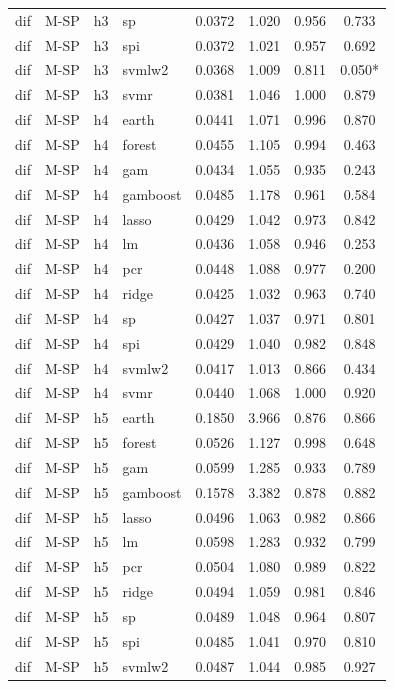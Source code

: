 \begin{ThreePartTable}
\begin{longtable}[t]{llclcccc}
dif & M-SP & h3 & sp & 0.0372 & 1.020 & 0.956 & 0.733\\
dif & M-SP & h3 & spi & 0.0372 & 1.021 & 0.957 & 0.692\\
dif & M-SP & h3 & svmlw2 & 0.0368 & 1.009 & 0.811 & 0.050*\\
dif & M-SP & h3 & svmr & 0.0381 & 1.046 & 1.000 & 0.879\\
\addlinespace
dif & M-SP & h4 & earth & 0.0441 & 1.071 & 0.996 & 0.870\\
dif & M-SP & h4 & forest & 0.0455 & 1.105 & 0.994 & 0.463\\
dif & M-SP & h4 & gam & 0.0434 & 1.055 & 0.935 & 0.243\\
dif & M-SP & h4 & gamboost & 0.0485 & 1.178 & 0.961 & 0.584\\
dif & M-SP & h4 & lasso & 0.0429 & 1.042 & 0.973 & 0.842\\
dif & M-SP & h4 & lm & 0.0436 & 1.058 & 0.946 & 0.253\\
dif & M-SP & h4 & pcr & 0.0448 & 1.088 & 0.977 & 0.200\\
dif & M-SP & h4 & ridge & 0.0425 & 1.032 & 0.963 & 0.740\\
dif & M-SP & h4 & sp & 0.0427 & 1.037 & 0.971 & 0.801\\
dif & M-SP & h4 & spi & 0.0429 & 1.040 & 0.982 & 0.848\\
dif & M-SP & h4 & svmlw2 & 0.0417 & 1.013 & 0.866 & 0.434\\
dif & M-SP & h4 & svmr & 0.0440 & 1.068 & 1.000 & 0.920\\
\addlinespace
dif & M-SP & h5 & earth & 0.1850 & 3.966 & 0.876 & 0.866\\
dif & M-SP & h5 & forest & 0.0526 & 1.127 & 0.998 & 0.648\\
dif & M-SP & h5 & gam & 0.0599 & 1.285 & 0.933 & 0.789\\
dif & M-SP & h5 & gamboost & 0.1578 & 3.382 & 0.878 & 0.882\\
dif & M-SP & h5 & lasso & 0.0496 & 1.063 & 0.982 & 0.866\\
dif & M-SP & h5 & lm & 0.0598 & 1.283 & 0.932 & 0.799\\
dif & M-SP & h5 & pcr & 0.0504 & 1.080 & 0.989 & 0.822\\
dif & M-SP & h5 & ridge & 0.0494 & 1.059 & 0.981 & 0.846\\
dif & M-SP & h5 & sp & 0.0489 & 1.048 & 0.964 & 0.807\\
dif & M-SP & h5 & spi & 0.0485 & 1.041 & 0.970 & 0.810\\
dif & M-SP & h5 & svmlw2 & 0.0487 & 1.044 & 0.985 & 0.927\\

\end{longtable}
\end{ThreePartTable}
